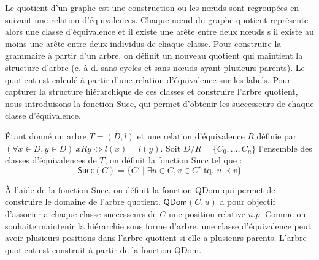 Le quotient d'un graphe est une construction ou les nœuds sont regroupées en suivant une relation d'équivalences.
Chaque nœud du graphe quotient représente alors une classe d'équivalence et il existe une arête entre deux nœuds s'il existe au moins une arête entre deux individus de chaque classe.
Pour construire la grammaire à partir d'un arbre, on définit un nouveau quotient qui maintient la structure d'arbre (c.-à-d. sans cycles et sans nœuds ayant plusieurs parents).
Le quotient est calculé à partir d'une relation d'équivalence sur les labels.
Pour capturer la structure hiérarchique de ces classes et construire l'arbre quotient, nous introduisons la fonction \textsf{Succ}, qui permet d'obtenir les successeurs de chaque classe d'équivalence.

\begin{definition}
    \label{def:struct:quotient:succ}
    Étant donné un arbre $T = (D, l)$ et une relation d'équivalence $R$ définie par $(\forall x \in D, y \in D) ~ x R y \iff l(x) = l(y)$.
    Soit $D/R = \{C_0, \dots, C_n\}$ l'ensemble des classes d'équivalences de $T$, on définit la fonction \textsf{Succ} tel que :
    \begin{equation}
        \textsf{Succ}(C) = \{ C' \mid \exists u \in C, v \in C' \text{ tq. } u \prec v \}
    \end{equation}
\end{definition}

À l'aide de la fonction \textsf{Succ}, on définit la fonction \textsf{QDom} qui permet de construire le domaine de l'arbre quotient.
$\textsf{QDom}(C, u)$ a pour objectif d'associer a chaque classe successeurs de $C$ une position relative $u.p$.
Comme on souhaite maintenir la hiérarchie sous forme d'arbre, une classe d'équivalence peut avoir plusieurs positions dans l'arbre quotient si elle a plusieurs parents.
L'arbre quotient est construit à partir de la fonction \textsf{QDom}.

